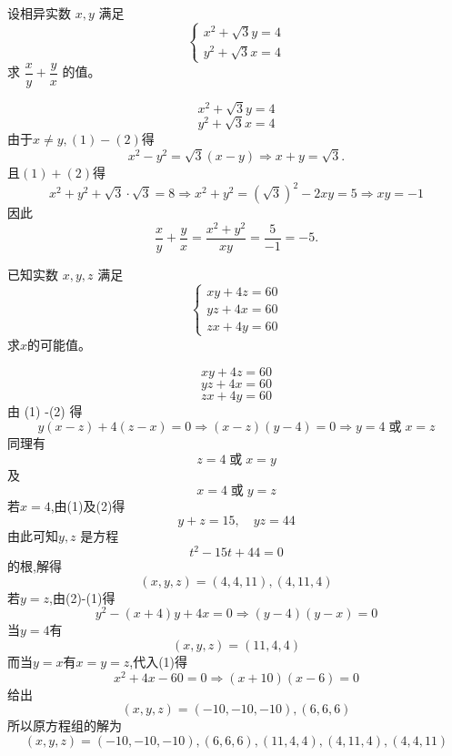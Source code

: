 \begin{questions}
    \question 设相异实数 $x,y$ 满足
    \[
    \begin{cases}
    x^2 + \sqrt{3} y = 4 \\
    y^2 + \sqrt{3} x = 4 
    \end{cases}
    \]
    求 $\dfrac{x}{y} + \dfrac{y}{x}$ 的值。
    \begin{solution}
        \[
        x^2 + \sqrt{3} y = 4 \tag{1}
        \]
        \[
        y^2 + \sqrt{3} x = 4 \tag{2}
        \]
        由于$x\neq y,(1)-(2)$得
        \[
        x^2 - y^2 = \sqrt{3} (x - y) \Rightarrow x + y = \sqrt{3}.
        \]
        且$(1)+(2)$得
        \[
        x^2 + y^2 + \sqrt{3} \cdot \sqrt{3} = 8 \Rightarrow x^2 + y^2 = (\sqrt3)^2-2xy=5 \Rightarrow xy = -1
        \]
        因此
        \[
        \frac{x}{y} + \frac{y}{x} = \frac{x^2 + y^2}{xy} = \frac{5}{-1} = -5.
        \]
    \end{solution}

    \question 已知实数 $x, y, z$ 满足
    \[
    \begin{cases}
    xy + 4z = 60 \\
    yz + 4x = 60 \\
    zx + 4y = 60 
    \end{cases}
    \]
    求$x$的可能值。
    \begin{solution}
        \[
        xy + 4z = 60 \tag{1}
        \]
        \[
        yz + 4x = 60 \tag{2}
        \]
        \[
        zx + 4y = 60 \tag{3}
        \]
        由 (1) -(2) 得
        \[
        y(x-z)+4(z-x)=0 \Rightarrow (x-z)(y-4)=0 \Rightarrow y=4 \; \text{或} \; x=z
        \]
        同理有
        \[
        z=4 \; \text{或} \; x=y
        \]
        及
        \[
        x=4 \; \text{或} \; y=z
        \]
        若$x=4$,由(1)及(2)得
        \[
        y+z=15,\quad yz=44 
        \]
        由此可知$y, z$ 是方程 
        \[
        t^2-15t+44=0
        \]
        的根,解得
        \[
        (x,y,z)=(4,4,11),(4,11,4)
        \]
        若$y=z$,由(2)-(1)得
        \[
        y^2-(x+4)y+4x=0 \Rightarrow (y-4)(y-x)=0 
        \]
        当$y=4$有
        \[
        (x,y,z)=(11,4,4)
        \]
        而当$y=x$有$x=y=z$,代入(1)得
        \[
        x^2+4x-60=0 \Rightarrow (x+10)(x-6)=0 
        \]
        给出
        \[
        (x,y,z)=(-10,-10,-10),(6,6,6)
        \]
        所以原方程组的解为
        \[
        (x,y,z)=(-10,-10,-10),(6,6,6),(11,4,4),(4,11,4),(4,4,11)
        \]
    \end{solution}


\end{questions}
